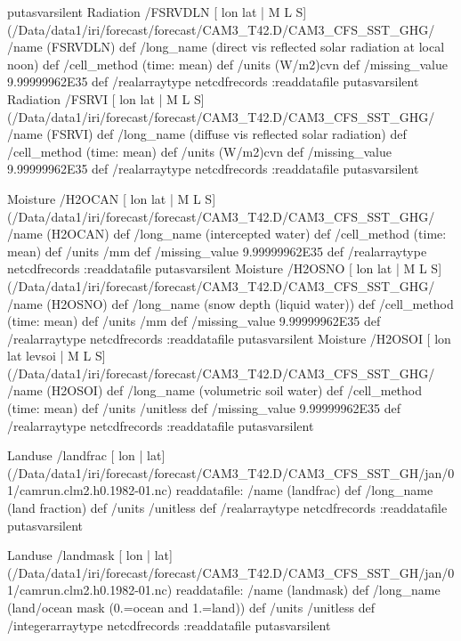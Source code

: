 \begin{ingrid}
{}putasvarsilent
Radiation /FSRVDLN{
[ lon lat | M L S] (/Data/data1/iri/forecast/forecast/CAM3_T42.D/CAM3_CFS_SST_GHG/%
/name (FSRVDLN) def
 /long_name (direct vis reflected solar radiation at local noon) def
 /cell_method (time: mean) def
 /units (W/m2)cvn def
 /missing_value 9.99999962E35 def
 /realarraytype netcdfrecords :readdatafile
}putasvarsilent
Radiation /FSRVI{
[ lon lat | M L S] (/Data/data1/iri/forecast/forecast/CAM3_T42.D/CAM3_CFS_SST_GHG/%
/name (FSRVI) def
 /long_name (diffuse vis reflected solar radiation) def
 /cell_method (time: mean) def
 /units (W/m2)cvn def
 /missing_value 9.99999962E35 def
 /realarraytype netcdfrecords :readdatafile
}putasvarsilent

Moisture /H2OCAN{
[ lon lat | M L S] (/Data/data1/iri/forecast/forecast/CAM3_T42.D/CAM3_CFS_SST_GHG/%
/name (H2OCAN) def
 /long_name (intercepted water) def
 /cell_method (time: mean) def
 /units /mm def
 /missing_value 9.99999962E35 def
 /realarraytype netcdfrecords :readdatafile
}putasvarsilent
Moisture /H2OSNO{
[ lon lat | M L S] (/Data/data1/iri/forecast/forecast/CAM3_T42.D/CAM3_CFS_SST_GHG/%
/name (H2OSNO) def
 /long_name (snow depth (liquid water)) def
 /cell_method (time: mean) def
 /units /mm def
 /missing_value 9.99999962E35 def
 /realarraytype netcdfrecords :readdatafile
}putasvarsilent
Moisture /H2OSOI{
[ lon lat levsoi | M L S] (/Data/data1/iri/forecast/forecast/CAM3_T42.D/CAM3_CFS_SST_GHG/%
/name (H2OSOI) def
 /long_name (volumetric soil water) def
 /cell_method (time: mean) def
 /units /unitless def
 /missing_value 9.99999962E35 def
 /realarraytype netcdfrecords :readdatafile
}putasvarsilent

Landuse /landfrac{
[ lon | lat] (/Data/data1/iri/forecast/forecast/CAM3_T42.D/CAM3_CFS_SST_GH/jan/01/camrun.clm2.h0.1982-01.nc) readdatafile:
/name (landfrac) def
 /long_name (land fraction) def
 /units /unitless def
 /realarraytype netcdfrecords :readdatafile
}putasvarsilent

Landuse /landmask{
[ lon | lat] (/Data/data1/iri/forecast/forecast/CAM3_T42.D/CAM3_CFS_SST_GH/jan/01/camrun.clm2.h0.1982-01.nc) readdatafile:
/name (landmask) def
 /long_name (land/ocean mask (0.=ocean and 1.=land)) def
 /units /unitless def
 /integerarraytype netcdfrecords :readdatafile
}putasvarsilent


\end{ingrid}
